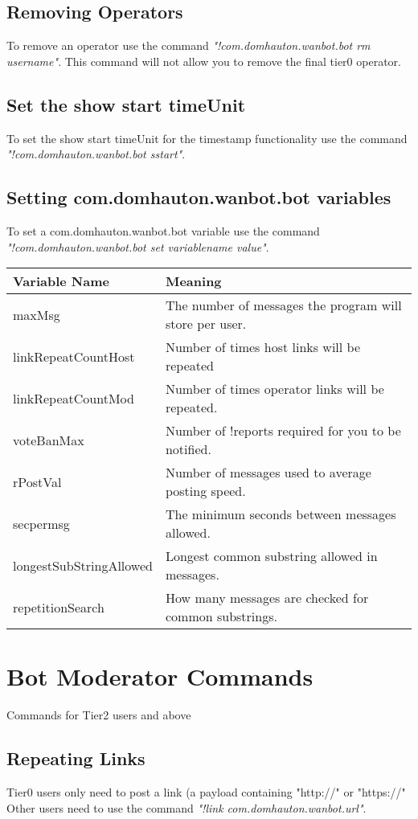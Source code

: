\documentclass[10pt]{article}
\begin{document}
\subsection{Removing Operators}
To remove an operator use the command \emph{"!com.domhauton.wanbot.bot rm username"}. This command will not allow you to remove the final tier0 operator.
\subsection{Set the show start timeUnit}
To set the show start timeUnit for the timestamp functionality use the command \emph{"!com.domhauton.wanbot.bot sstart"}.
\subsection{Setting com.domhauton.wanbot.bot variables}
To set a com.domhauton.wanbot.bot variable use the command \emph{"!com.domhauton.wanbot.bot set variablename value"}.\\
\begin{tabular}{| l | l |}
\hline
Variable Name & Meaning\\ \hline
maxMsg & The number of messages the program will store per user.\\ \hline
linkRepeatCountHost & Number of times host links will be repeated\\ \hline
linkRepeatCountMod & Number of times operator links will be repeated.\\ \hline
voteBanMax & Number of !reports required for you to be notified.\\ \hline
rPostVal & Number of messages used to average posting speed.\\ \hline
secpermsg & The minimum seconds between messages allowed.\\ \hline
longestSubStringAllowed & Longest common substring allowed in messages.\\ \hline
repetitionSearch & How many messages are checked for common substrings.\\ \hline
\end{tabular}
\section{Bot Moderator Commands}
Commands for Tier2 users and above
\subsection{Repeating Links}
Tier0 users only need to post a link (a payload containing "http://" or "https://"\\
Other users need to use the command \emph{"!link com.domhauton.wanbot.url"}.
\end{document}
